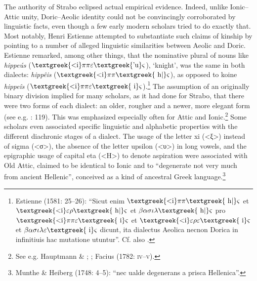 The authority of Strabo eclipsed actual empirical evidence. Indeed, unlike Ionic–Attic unity, Doric–Aeolic identity could not be convincingly corroborated by linguistic facts, even though a few early modern scholars tried to do exactly that. Most notably, Henri Estienne attempted to substantiate such claims of kinship by pointing to a number of alleged linguistic similarities between Aeolic and Doric. Estienne remarked, among other things, that the nominative plural of nouns like \textit{hippeús} ($\text{\textgreek{<i}}\pi \pi \varepsilon \text{\textgreek{'u}}\varsigma $), ‘knight’, was the same in both dialects: \textit{hippêis} ($\text{\textgreek{<i}}\pi \pi \text{\textgreek{~h|}}\varsigma $), as opposed to koine \textit{hippeîs} ($\text{\textgreek{<i}}\pi \pi \varepsilon \text{\textgreek{~i}}\varsigma $).\footnote{Estienne (1581: 25–26): “Sicut enim $\text{\textgreek{<i}}\pi \pi \text{\textgreek{~h|}}\varsigma $ et $\text{\textgreek{<i}}\varepsilon \rho \text{\textgreek{~h|}}\varsigma $ et $\beta \alpha \sigma \iota \lambda \text{\textgreek{~h|}}\varsigma $ pro $\text{\textgreek{<i}}\pi \pi \varepsilon \text{\textgreek{~i}}\varsigma $ et $\text{\textgreek{<i}}\varepsilon \rho \varepsilon \text{\textgreek{~i}}\varsigma $ et $\beta \alpha \sigma \iota \lambda \varepsilon \text{\textgreek{~i}}\varsigma $ dicunt, ita dialectus Aeolica necnon Dorica in infinitiuis hac mutatione utuntur”. Cf. also \citet[179]{Trendelenburg1782}.} The assumption of an originally binary division implied for many scholars, as it had done for Strabo, that there were two forms of each dialect: an older, rougher and a newer, more elegant form (see e.g. \citealt{Mazzocchi1754}: 119). This was emphasized especially often for Attic and Ionic.\footnote{See e.g. Hauptmann \& \citet[18]{Schmid1737}; \citet[137]{Walch1772}; Facius (1782: \textsc{iv–v}).} Some scholars even associated specific linguistic and alphabetic properties with the different diachronic stages of a dialect. The usage of the letter xi (<ξ>) instead of sigma (<σ>), the absence of the letter upsilon (<υ>) in long vowels, and the epigraphic usage of capital eta (<H>) to denote aspiration were associated with Old Attic, claimed to be identical to Ionic and to “degenerate not very much from ancient Hellenic”, conceived as a kind of ancestral Greek language.\footnote{Munthe \& Heiberg (1748: 4–5): “nec ualde degenerans a prisca Hellenica”.}

